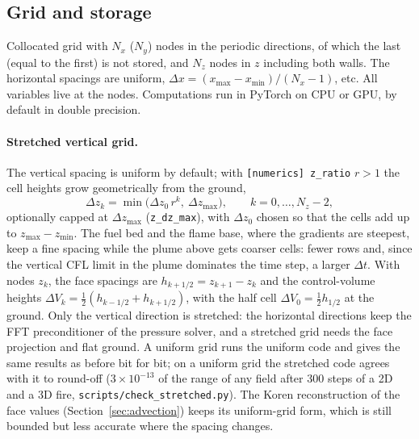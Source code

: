 \documentclass[11pt,a4paper]{article}
\newcommand{\code}[1]{\texttt{#1}}
\begin{document}
\subsection{Grid and storage}\label{sec:grid}
Collocated grid with $N_x$ ($N_y$) nodes in the periodic directions, of which the last
(equal to the first) is not stored, and $N_z$ nodes in $z$ including both walls. The horizontal spacings
are uniform, $\Delta x=(x_\text{max}-x_\text{min})/(N_x-1)$, etc. All variables live at the nodes.
Computations run in PyTorch on CPU or GPU, by default in double precision.

\paragraph{Stretched vertical grid.} The vertical spacing is uniform by default; with
\code{[numerics] z\_ratio} $r>1$ the cell heights grow geometrically from the ground,
\begin{equation}
  \Delta z_k=\min\big(\Delta z_0\,r^k,\ \Delta z_\text{max}\big),\qquad k=0,\dots,N_z-2,
\end{equation}
optionally capped at $\Delta z_\text{max}$ (\code{z\_dz\_max}), with $\Delta z_0$ chosen so that the cells
add up to $z_\text{max}-z_\text{min}$. The fuel bed and the flame base, where the gradients are steepest,
keep a fine spacing while the plume above gets coarser cells: fewer rows and, since the vertical CFL
limit in the plume dominates the time step, a larger $\Delta t$. With nodes $z_k$, the face spacings are
$h_{k+1/2}=z_{k+1}-z_k$ and the control-volume heights
$\Delta V_k=\tfrac12(h_{k-1/2}+h_{k+1/2})$, with the half cell $\Delta V_0=\tfrac12h_{1/2}$ at the ground.
Only the vertical direction is stretched: the horizontal directions keep the FFT preconditioner of the
pressure solver, and a stretched grid needs the face projection and flat ground. A
uniform grid runs the uniform code and gives the same results as before bit for bit; on a uniform grid
the stretched code agrees with it to round-off ($3\times10^{-13}$ of the range of any field after 300 steps of a
2D and a 3D fire, \code{scripts/check\_stretched.py}). The Koren reconstruction of the face values
(Section~\ref{sec:advection}) keeps its uniform-grid form, which is still bounded but less accurate where
the spacing changes.
\end{document}
